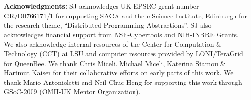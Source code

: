 \documentclass[3p,twocolumn]{elsarticle}
\begin{document}








\footnotesize{ {\noindent \bf Acknowledgments: }SJ acknowledges UK EPSRC grant
  number GR/D0766171/1 for supporting SAGA and the e-Science
  Institute, Edinburgh for the research theme, ``Distributed
  Programming Abstractions''.  SJ also acknowledges financial support
  from NSF-Cybertools and NIH-INBRE Grants.  We also acknowledge
  internal resources of the Center for Computation \& Technology (CCT)
  at LSU and computer resources provided by LONI/TeraGrid for
  QueenBee.  We thank Chris Miceli, Michael Miceli, Katerina Stamou \&
  Hartmut Kaiser for their collaborative efforts on early parts of
  this work. We thank Mario Antonioletti and Neil Chue Hong for
  supporting this work through GSoC-2009 (OMII-UK Mentor
  Organization).}



\end{document}

